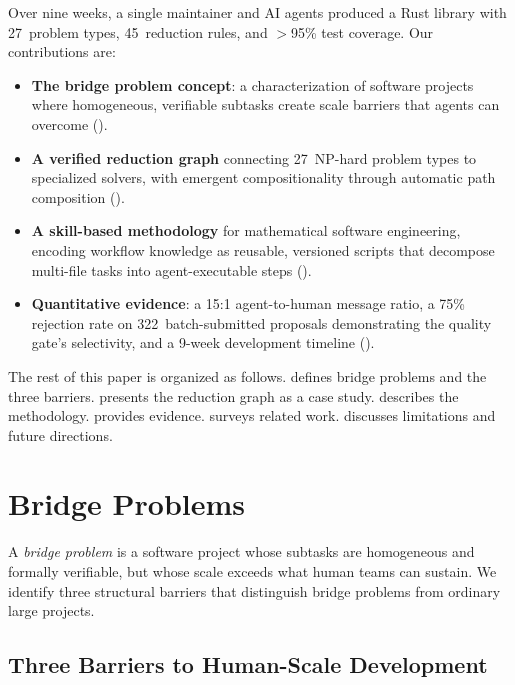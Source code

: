 \documentclass[conference]{IEEEtran}
\begin{document}
Over nine weeks, a single maintainer and AI agents produced a Rust library with 27~problem types, 45~reduction rules, and $>$95\% test coverage.
Our contributions are:
\begin{itemize}
  \item \textbf{The bridge problem concept}: a characterization of software projects where homogeneous, verifiable subtasks create scale barriers that agents can overcome ().
  \item \textbf{A verified reduction graph} connecting 27~NP-hard problem types to specialized solvers, with emergent compositionality through automatic path composition ().
  \item \textbf{A skill-based methodology} for mathematical software engineering, encoding workflow knowledge as reusable, versioned scripts that decompose multi-file tasks into agent-executable steps ().
  \item \textbf{Quantitative evidence}: a 15:1 agent-to-human message ratio, a 75\% rejection rate on 322~batch-submitted proposals demonstrating the quality gate's selectivity, and a 9-week development timeline ().
\end{itemize}

The rest of this paper is organized as follows.
 defines bridge problems and the three barriers.
 presents the reduction graph as a case study.
 describes the methodology.
 provides evidence.
 surveys related work.
 discusses limitations and future directions.

\section{Bridge Problems}\label{sec:bridge}

A \emph{bridge problem} is a software project whose subtasks are homogeneous and formally verifiable, but whose scale exceeds what human teams can sustain.
We identify three structural barriers that distinguish bridge problems from ordinary large projects.

\subsection{Three Barriers to Human-Scale Development}
\end{document}
